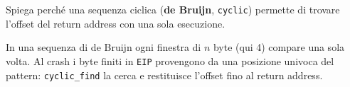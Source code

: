 \question[4]
Spiega perché una sequenza ciclica (\textbf{de Bruijn}, \lstinline|cyclic|) permette di trovare l'offset del return address con una sola esecuzione.
\begin{solution}
In una sequenza di de Bruijn ogni finestra di $n$ byte (qui 4) compare una sola volta. Al crash i byte finiti in \lstinline|EIP| provengono da una posizione univoca del pattern: \lstinline|cyclic_find| la cerca e restituisce l'offset fino al return address.
\end{solution}
